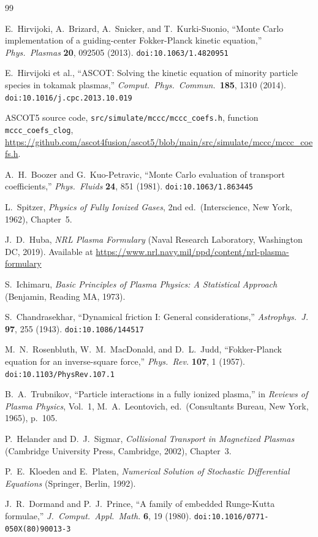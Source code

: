 \documentclass[11pt]{article}
\begin{document}
\begin{thebibliography}{99}

E.~Hirvijoki, A.~Brizard, A.~Snicker, and T.~Kurki-Suonio,
``Monte Carlo implementation of a guiding-center Fokker-Planck kinetic
equation,''
\textit{Phys.\ Plasmas} \textbf{20}, 092505 (2013).
\texttt{doi:10.1063/1.4820951}

E.~Hirvijoki et al.,
``ASCOT: Solving the kinetic equation of minority particle species in
tokamak plasmas,''
\textit{Comput.\ Phys.\ Commun.}\ \textbf{185}, 1310 (2014).
\texttt{doi:10.1016/j.cpc.2013.10.019}

ASCOT5 source code, \texttt{src/simulate/mccc/mccc\_coefs.h},
function \texttt{mccc\_coefs\_clog},
\url{https://github.com/ascot4fusion/ascot5/blob/main/src/simulate/mccc/mccc_coefs.h}.

A.~H.~Boozer and G.~Kuo-Petravic,
``Monte Carlo evaluation of transport coefficients,''
\textit{Phys.\ Fluids} \textbf{24}, 851 (1981).
\texttt{doi:10.1063/1.863445}

L.~Spitzer,
\textit{Physics of Fully Ionized Gases}, 2nd ed.\
(Interscience, New York, 1962), Chapter~5.

J.~D.~Huba,
\textit{NRL Plasma Formulary}
(Naval Research Laboratory, Washington DC, 2019).
Available at \url{https://www.nrl.navy.mil/ppd/content/nrl-plasma-formulary}

S.~Ichimaru,
\textit{Basic Principles of Plasma Physics: A Statistical Approach}
(Benjamin, Reading MA, 1973).

S.~Chandrasekhar,
``Dynamical friction I: General considerations,''
\textit{Astrophys.\ J.} \textbf{97}, 255 (1943).
\texttt{doi:10.1086/144517}

M.~N.~Rosenbluth, W.~M.~MacDonald, and D.~L.~Judd,
``Fokker-Planck equation for an inverse-square force,''
\textit{Phys.\ Rev.} \textbf{107}, 1 (1957).
\texttt{doi:10.1103/PhysRev.107.1}

B.~A.~Trubnikov,
``Particle interactions in a fully ionized plasma,''
in \textit{Reviews of Plasma Physics}, Vol.~1,
M.~A.~Leontovich, ed.\ (Consultants Bureau, New York, 1965), p.~105.

P.~Helander and D.~J.~Sigmar,
\textit{Collisional Transport in Magnetized Plasmas}
(Cambridge University Press, Cambridge, 2002), Chapter~3.

P.~E.~Kloeden and E.~Platen,
\textit{Numerical Solution of Stochastic Differential Equations}
(Springer, Berlin, 1992).

J.~R.~Dormand and P.~J.~Prince,
``A family of embedded Runge-Kutta formulae,''
\textit{J.\ Comput.\ Appl.\ Math.} \textbf{6}, 19 (1980).
\texttt{doi:10.1016/0771-050X(80)90013-3}

\end{thebibliography}
\end{document}
